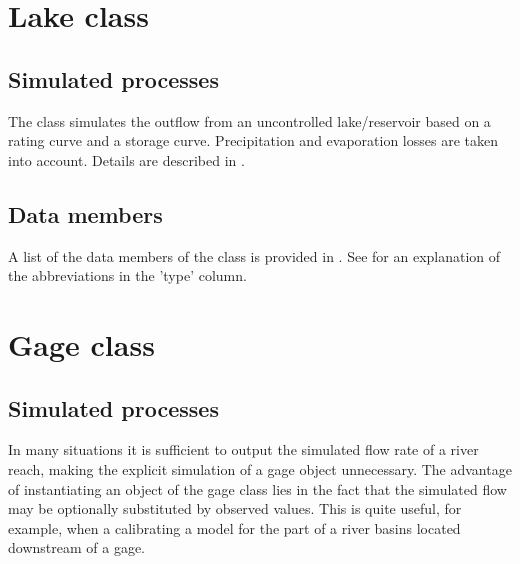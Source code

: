 \section{Lake class} \label{sec:classes:catchmod:lake}

\subsection{Simulated processes} \label{sec:classes:catchmod:lake:processes}
The class simulates the outflow from an uncontrolled lake/reservoir based on a rating curve and a storage curve. Precipitation and evaporation losses are taken into account. Details are described in .

\subsection{Data members} \label{sec:classes:catchmod:lake:members}
A list of the data members of the class is provided in . See \citet{Echse-Main-Doc} for an explanation of the abbreviations in the 'type' column.



\section{Gage class} \label{sec:classes:catchmod:gage}

\subsection{Simulated processes} \label{sec:classes:catchmod:gage:processes}
In many situations it is sufficient to output the simulated flow rate of a river reach, making the explicit simulation of a gage object unnecessary. The advantage of instantiating an object of the gage class lies in the fact that the simulated flow may be optionally substituted by observed values. This is quite useful, for example, when a calibrating a model for the part of a river basins located downstream of a gage.

